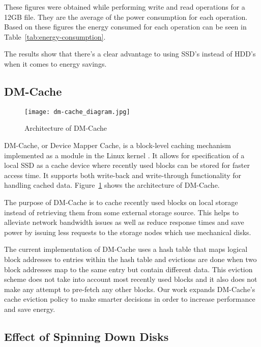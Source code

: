 These figures were obtained while performing write and read operations for a
12GB file. They are the average of the power consumption for each
operation. Based on these figures the energy consumed for each operation can be
seen in Table~\ref{tab:energy-consumption}.

The results show that there's a clear advantage to using SSD's instead of HDD's
when it comes to energy savings.

\subsection{DM-Cache}

\begin{figure}
  \caption{Architecture of DM-Cache}
  \centering \texttt{[image: dm-cache\_diagram.jpg]}
  \label{fig:dm-cache}
\end{figure}

DM-Cache, or Device Mapper Cache, is a block-level caching mechanism implemented
as a module in the Linux kernel \cite{DM-Cache}. It allows for specification of
a local SSD as a cache device where recently used blocks can be stored for
faster access time. It supports both write-back and write-through functionality
for handling cached data. Figure~\ref{fig:dm-cache} shows the architecture of
DM-Cache.

The purpose of DM-Cache is to cache recently used blocks on local storage
instead of retrieving them from some external storage source. This helps to
alleviate network bandwidth issues as well as reduce response times and save
power by issuing less requests to the storage nodes which use mechanical disks.

The current implementation of DM-Cache uses a hash table that maps logical block
addresses to entries within the hash table and evictions are done when two block
addresses map to the same entry but contain different data. This eviction scheme
does not take into account most recently used blocks and it also does not make
any attempt to pre-fetch any other blocks. Our work expands DM-Cache's cache
eviction policy to make smarter decisions in order to increase performance and
save energy.

\subsection{Effect of Spinning Down Disks}

